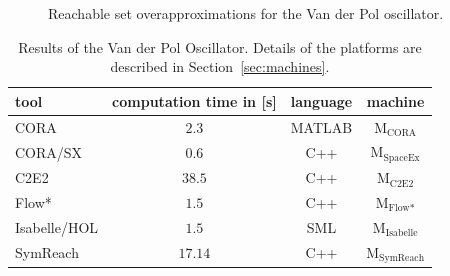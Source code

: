 \documentclass[EPiC]{easychair}
\begin{document}
\begin{figure}[p]
{  \label{fig:vanderpol:flowstar}}
\caption{Reachable set overapproximations for the Van der Pol oscillator.}
\label{fig:vanderpol}
\end{figure}

\begin{table}[t]
	\setlength{\tabcolsep}{4pt}
	\renewcommand{\arraystretch}{1.2}
	\centering
	\caption{Results of the Van der Pol Oscillator. Details of the platforms are described in Section~\ref{sec:machines}.}\label{tab:compTimes:vanderpol}
	\begin{tabular}[c]{lccc}
	\hline
		 \textbf{tool} & \textbf{computation time in [s]} & \textbf{language} & \textbf{machine} \\
		 \hline
         CORA & $2.3$ & MATLAB & M$_{\text{CORA}}$ \\
         CORA/SX & $0.6$ & C++ & M$_{\text{SpaceEx}}$ \\
         {C2E2} & {$38.5$} & {C++} & {M$_{\text{C2E2}}$} \\
         Flow* & $1.5$ & C++ & M$_{\text{Flow*}}$ \\
         Isabelle/HOL & $1.5$ & SML & M$_{\text{Isabelle}}$ \\
         SymReach & $17.14$ & C++ & M$_{\text{SymReach}}$ \\
		 \hline
	\end{tabular}
\end{table}
\end{document}
